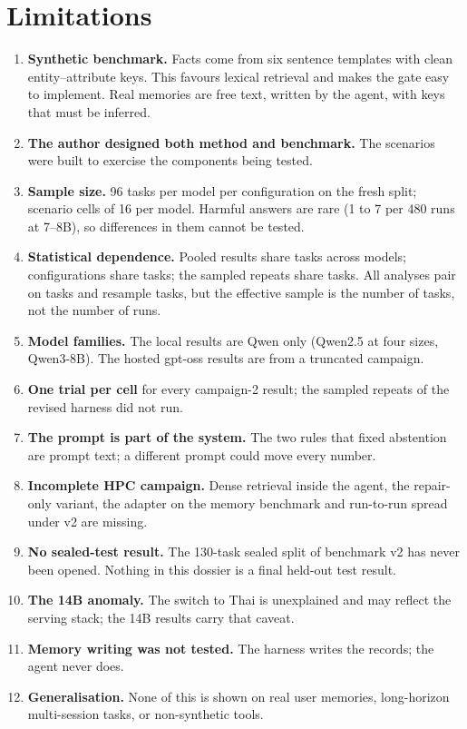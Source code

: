\documentclass[10.5pt,a4paper,oneside]{report}
\begin{document}
\section{Limitations}
\begin{enumerate}
\item \textbf{Synthetic benchmark.} Facts come from six sentence templates with clean entity–attribute keys. This favours lexical retrieval and makes the gate easy to implement. Real memories are free text, written by the agent, with keys that must be inferred.
\item \textbf{The author designed both method and benchmark.} The scenarios were built to exercise the components being tested.
\item \textbf{Sample size.} 96 tasks per model per configuration on the fresh split; scenario cells of 16 per model. Harmful answers are rare (1 to 7 per 480 runs at 7–8B), so differences in them cannot be tested.
\item \textbf{Statistical dependence.} Pooled results share tasks across models; configurations share tasks; the sampled repeats share tasks. All analyses pair on tasks and resample tasks, but the effective sample is the number of tasks, not the number of runs.
\item \textbf{Model families.} The local results are Qwen only (Qwen2.5 at four sizes, Qwen3-8B). The hosted gpt-oss results are from a truncated campaign.
\item \textbf{One trial per cell} for every campaign-2 result; the sampled repeats of the revised harness did not run.
\item \textbf{The prompt is part of the system.} The two rules that fixed abstention are prompt text; a different prompt could move every number.
\item \textbf{Incomplete HPC campaign.} Dense retrieval inside the agent, the repair-only variant, the adapter on the memory benchmark and run-to-run spread under v2 are missing.
\item \textbf{No sealed-test result.} The 130-task sealed split of benchmark v2 has never been opened. Nothing in this dossier is a final held-out test result.
\item \textbf{The 14B anomaly.} The switch to Thai is unexplained and may reflect the serving stack; the 14B results carry that caveat.
\item \textbf{Memory writing was not tested.} The harness writes the records; the agent never does.
\item \textbf{Generalisation.} None of this is shown on real user memories, long-horizon multi-session tasks, or non-synthetic tools.
\end{enumerate}
\clearpage
\end{document}
